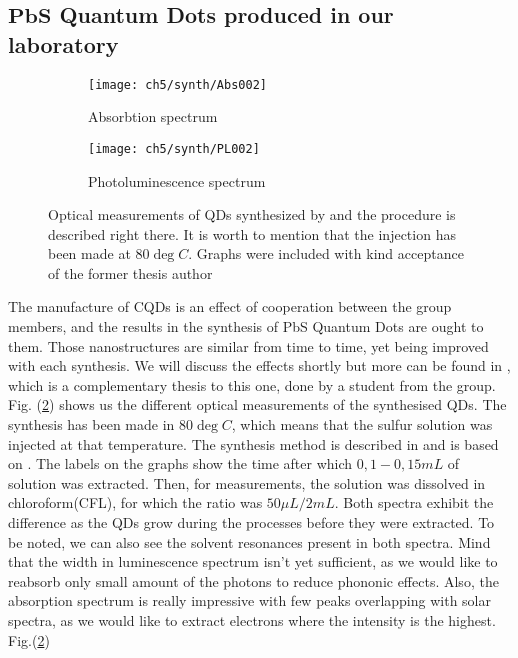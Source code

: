 \subsection{$\mathbf{PbS}$ Quantum Dots produced in our laboratory}

\begin{figure}
\centering
\begin{subfigure}[b]{0.7\textwidth}
\centering
\texttt{[image: ch5/synth/Abs002]}
\caption{Absorbtion spectrum}
\end{subfigure}

\hfill

\begin{subfigure}[b]{0.7\textwidth}
\centering
\texttt{[image: ch5/synth/PL002]}
\caption{Photoluminescence spectrum}
\label{fig:synth}
\end{subfigure}

\caption{Optical measurements of QDs synthesized by \cite{swietek} and the procedure is described right there. It is worth to mention that the injection has been made at 80$\deg C$. Graphs were included with kind acceptance of the former thesis author}
\end{figure}

The manufacture of CQDs is an effect of cooperation between the group members, and the results in the synthesis of PbS Quantum Dots are ought to them. Those nanostructures are similar from time to time, yet being improved with each synthesis. We will discuss the effects shortly but more can be found in \cite{swietek}, which is a complementary thesis to this one, done by a student from the group. Fig. (\ref{fig:synth}) shows us the different optical measurements of the synthesised QDs. The synthesis has been made in 80$\deg C$, which means that the sulfur solution was injected at that temperature. The synthesis method is described in \cite{swietek} and is based on \cite{synthesis}. The labels on the graphs show the time after which $0,1-0,15 mL$ of solution was extracted. Then, for measurements, the solution was dissolved in chloroform(CFL), for which the ratio was $50\mu L/2mL$. Both spectra exhibit the difference as the QDs grow during the processes before they were extracted. To be noted, we can also see the solvent resonances present in both spectra. Mind that the width in luminescence spectrum isn't yet sufficient, as we would like to reabsorb only small amount of the photons to reduce phononic effects. Also, the absorption spectrum is really impressive with few peaks overlapping with solar spectra, as we would like to extract electrons where the intensity is the highest. Fig.(\ref{fig:synth}) 


